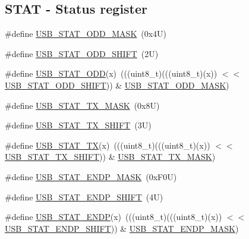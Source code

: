 \subsection*{S\+T\+AT -\/ Status register}
\begin{DoxyCompactItemize}
\item 
\#define \mbox{\hyperlink{group___u_s_b___register___masks_ga49caa3c5b36fc89eadadd60cdf331643}{U\+S\+B\+\_\+\+S\+T\+A\+T\+\_\+\+O\+D\+D\+\_\+\+M\+A\+SK}}~(0x4\+U)
\item 
\#define \mbox{\hyperlink{group___u_s_b___register___masks_ga15f3e2fa671ea1a59e0b24a9697faf8a}{U\+S\+B\+\_\+\+S\+T\+A\+T\+\_\+\+O\+D\+D\+\_\+\+S\+H\+I\+FT}}~(2\+U)
\item 
\#define \mbox{\hyperlink{group___u_s_b___register___masks_gaf2435ac1190d60f8c1db948f6dd2a844}{U\+S\+B\+\_\+\+S\+T\+A\+T\+\_\+\+O\+DD}}(x)~(((uint8\+\_\+t)(((uint8\+\_\+t)(x)) $<$$<$ \mbox{\hyperlink{group___u_s_b___register___masks_ga15f3e2fa671ea1a59e0b24a9697faf8a}{U\+S\+B\+\_\+\+S\+T\+A\+T\+\_\+\+O\+D\+D\+\_\+\+S\+H\+I\+FT}})) \& \mbox{\hyperlink{group___u_s_b___register___masks_ga49caa3c5b36fc89eadadd60cdf331643}{U\+S\+B\+\_\+\+S\+T\+A\+T\+\_\+\+O\+D\+D\+\_\+\+M\+A\+SK}})
\item 
\#define \mbox{\hyperlink{group___u_s_b___register___masks_gab953f904ef3a2b838a922ebdf69cf140}{U\+S\+B\+\_\+\+S\+T\+A\+T\+\_\+\+T\+X\+\_\+\+M\+A\+SK}}~(0x8\+U)
\item 
\#define \mbox{\hyperlink{group___u_s_b___register___masks_ga5173e8423017932d90919ddb18f918bd}{U\+S\+B\+\_\+\+S\+T\+A\+T\+\_\+\+T\+X\+\_\+\+S\+H\+I\+FT}}~(3\+U)
\item 
\#define \mbox{\hyperlink{group___u_s_b___register___masks_ga879e6d045ec05d5edcad4e05e091c568}{U\+S\+B\+\_\+\+S\+T\+A\+T\+\_\+\+TX}}(x)~(((uint8\+\_\+t)(((uint8\+\_\+t)(x)) $<$$<$ \mbox{\hyperlink{group___u_s_b___register___masks_ga5173e8423017932d90919ddb18f918bd}{U\+S\+B\+\_\+\+S\+T\+A\+T\+\_\+\+T\+X\+\_\+\+S\+H\+I\+FT}})) \& \mbox{\hyperlink{group___u_s_b___register___masks_gab953f904ef3a2b838a922ebdf69cf140}{U\+S\+B\+\_\+\+S\+T\+A\+T\+\_\+\+T\+X\+\_\+\+M\+A\+SK}})
\item 
\#define \mbox{\hyperlink{group___u_s_b___register___masks_gad8a184e838de511e23aa32011fc9f0b6}{U\+S\+B\+\_\+\+S\+T\+A\+T\+\_\+\+E\+N\+D\+P\+\_\+\+M\+A\+SK}}~(0x\+F0\+U)
\item 
\#define \mbox{\hyperlink{group___u_s_b___register___masks_ga5d85a4b028002bc9ce0f1650111cd49a}{U\+S\+B\+\_\+\+S\+T\+A\+T\+\_\+\+E\+N\+D\+P\+\_\+\+S\+H\+I\+FT}}~(4\+U)
\item 
\#define \mbox{\hyperlink{group___u_s_b___register___masks_ga0302fe6637ae59174d7702947430dbba}{U\+S\+B\+\_\+\+S\+T\+A\+T\+\_\+\+E\+N\+DP}}(x)~(((uint8\+\_\+t)(((uint8\+\_\+t)(x)) $<$$<$ \mbox{\hyperlink{group___u_s_b___register___masks_ga5d85a4b028002bc9ce0f1650111cd49a}{U\+S\+B\+\_\+\+S\+T\+A\+T\+\_\+\+E\+N\+D\+P\+\_\+\+S\+H\+I\+FT}})) \& \mbox{\hyperlink{group___u_s_b___register___masks_gad8a184e838de511e23aa32011fc9f0b6}{U\+S\+B\+\_\+\+S\+T\+A\+T\+\_\+\+E\+N\+D\+P\+\_\+\+M\+A\+SK}})
\end{DoxyCompactItemize}

